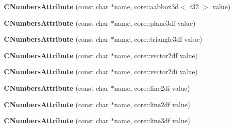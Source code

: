 \begin{DoxyCompactItemize}
\item 
\hypertarget{classirr_1_1io_1_1_c_numbers_attribute_a6c0519028c4deb37dfbb51bd3cd7793d}{{\bfseries C\-Numbers\-Attribute} (const char $\ast$name, core\-::aabbox3d$<$ f32 $>$ value)}\label{classirr_1_1io_1_1_c_numbers_attribute_a6c0519028c4deb37dfbb51bd3cd7793d}

\item 
\hypertarget{classirr_1_1io_1_1_c_numbers_attribute_ad9d14b9ceafc413326ef683c5c66d904}{{\bfseries C\-Numbers\-Attribute} (const char $\ast$name, core\-::plane3df value)}\label{classirr_1_1io_1_1_c_numbers_attribute_ad9d14b9ceafc413326ef683c5c66d904}

\item 
\hypertarget{classirr_1_1io_1_1_c_numbers_attribute_ac156e795b2d2650dd94fbc2edaefb032}{{\bfseries C\-Numbers\-Attribute} (const char $\ast$name, core\-::triangle3df value)}\label{classirr_1_1io_1_1_c_numbers_attribute_ac156e795b2d2650dd94fbc2edaefb032}

\item 
\hypertarget{classirr_1_1io_1_1_c_numbers_attribute_aaeaef4984ca04ff8adce6eca402127e1}{{\bfseries C\-Numbers\-Attribute} (const char $\ast$name, core\-::vector2df value)}\label{classirr_1_1io_1_1_c_numbers_attribute_aaeaef4984ca04ff8adce6eca402127e1}

\item 
\hypertarget{classirr_1_1io_1_1_c_numbers_attribute_a33ed2b070b3e4ddc6ff7cd58af31840e}{{\bfseries C\-Numbers\-Attribute} (const char $\ast$name, core\-::vector2di value)}\label{classirr_1_1io_1_1_c_numbers_attribute_a33ed2b070b3e4ddc6ff7cd58af31840e}

\item 
\hypertarget{classirr_1_1io_1_1_c_numbers_attribute_a96d4e2a0c6d3ae5d82d1d880055d3a93}{{\bfseries C\-Numbers\-Attribute} (const char $\ast$name, core\-::line2di value)}\label{classirr_1_1io_1_1_c_numbers_attribute_a96d4e2a0c6d3ae5d82d1d880055d3a93}

\item 
\hypertarget{classirr_1_1io_1_1_c_numbers_attribute_ac8e9b5ac2ed2a92d542c4253a3e5b446}{{\bfseries C\-Numbers\-Attribute} (const char $\ast$name, core\-::line2df value)}\label{classirr_1_1io_1_1_c_numbers_attribute_ac8e9b5ac2ed2a92d542c4253a3e5b446}

\item 
\hypertarget{classirr_1_1io_1_1_c_numbers_attribute_a3dcce77f1379287756bbce0db0ac0564}{{\bfseries C\-Numbers\-Attribute} (const char $\ast$name, core\-::line3df value)}\label{classirr_1_1io_1_1_c_numbers_attribute_a3dcce77f1379287756bbce0db0ac0564}


\end{DoxyCompactItemize}
